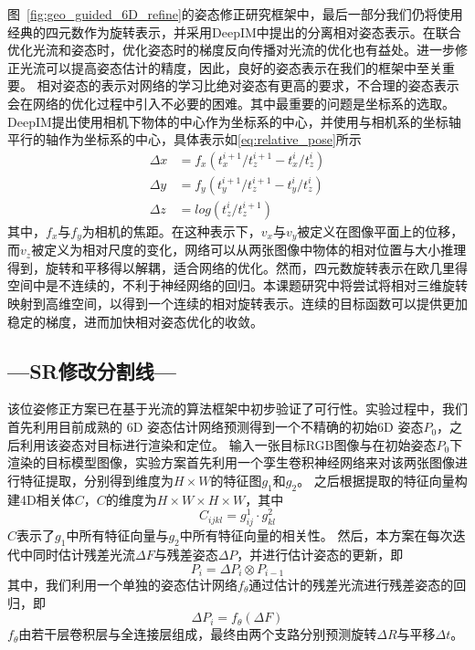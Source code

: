 \documentclass[12pt]{article}
\begin{document}
图~\ref{fig:geo_guided_6D_refine}的姿态修正研究框架中，最后一部分我们仍将使用经典的四元数作为旋转表示，并采用DeepIM\cite{li2018deepim}中提出的分离相对姿态表示。在联合优化光流和姿态时，优化姿态时的梯度反向传播对光流的优化也有益处。进一步修正光流可以提高姿态估计的精度，因此，良好的姿态表示在我们的框架中至关重要。
相对姿态的表示对网络的学习比绝对姿态有更高的要求，不合理的姿态表示会在网络的优化过程中引入不必要的困难。其中最重要的问题是坐标系的选取。DeepIM提出使用相机下物体的中心作为坐标系的中心，并使用与相机系的坐标轴平行的轴作为坐标系的中心，具体表示如\ref{eq:relative_pose}所示
\begin{equation}
    \begin{aligned}
    \Delta x & = f_x(t_x^{i+1}/t_z^{i+1} - t_x^i/t_z^i)\\
    \Delta y & = f_y(t_y^{i+1}/t_z^{i+1} - t_y^i/t_z^i) \\
    \Delta z & = log(t_z^i/t_z^{i+1})
    \label{eq:relative_pose}
\end{aligned}
\end{equation}
其中，$f_x$与$f_y$为相机的焦距。在这种表示下，$v_x$与$v_y$被定义在图像平面上的位移，而$v_z$被定义为相对尺度的变化，网络可以从两张图像中物体的相对位置与大小推理得到，旋转和平移得以解耦，适合网络的优化。然而，四元数旋转表示在欧几里得空间中是不连续的，不利于神经网络的回归。本课题研究中将尝试将相对三维旋转映射到高维空间，以得到一个连续的相对旋转表示。连续的目标函数可以提供更加稳定的梯度，进而加快相对姿态优化的收敛。


\subsection{---SR修改分割线---}


    
该位姿修正方案已在基于光流的算法框架中初步验证了可行性。实验过程中，我们首先利用目前成熟的 6D 姿态估计网络预测得到一个不精确的初始6D 姿态$P_0$，之后利用该姿态对目标进行渲染和定位。
输入一张目标RGB图像与在初始姿态$P_0$下渲染的目标模型图像，实验方案首先利用一个孪生卷积神经网络来对该两张图像进行特征提取，分别得到维度为$H\times W$的特征图$g_1$和$g_2$。
之后根据提取的特征向量构建4D相关体$C$，$C$的维度为$H\times W \times H \times W$，其中
\begin{equation}
    C_{ijkl} = g^1_{ij} \cdot g^2_{kl}
\end{equation}
$C$表示了$g_1$中所有特征向量与$g_2$中所有特征向量的相关性。
然后，本方案在每次迭代中同时估计残差光流$\Delta F$与残差姿态$\Delta P$，并进行估计姿态的更新，即
\begin{equation}
    P_i = \Delta P_i \otimes P_{i-1}
\end{equation}
其中，我们利用一个单独的姿态估计网络$f_{\theta}$通过估计的残差光流进行残差姿态的回归，即
\begin{equation}
    \Delta P_i = f_{\theta}(\Delta F)
\end{equation}
$f_\theta$由若干层卷积层与全连接层组成，最终由两个支路分别预测旋转$\Delta R$与平移$\Delta t$。
\end{document}
